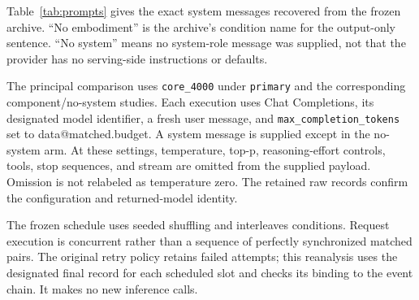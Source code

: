 \documentclass[11pt]{article}
\makeatletter
\newcommand{\D}[1]{\csname data@#1\endcsname}
\makeatother
\begin{document}
Table~\ref{tab:prompts} gives the exact system messages recovered from the frozen archive. ``No embodiment'' is the archive's condition name for the output-only sentence. ``No system'' means no system-role message was supplied, not that the provider has no serving-side instructions or defaults.

\begin{table}[H]
\centering\small

\caption{Exact system conditions. User-message bytes are held fixed within each prompt comparison.}
\label{tab:prompts}
\end{table}

The principal comparison uses \texttt{core\_4000} under \texttt{primary} and the corresponding component/no-system studies. Each execution uses Chat Completions, its designated model identifier, a fresh user message, and \texttt{max\_completion\_tokens} set to \D{matched.budget}. A system message is supplied except in the no-system arm. At these settings, temperature, top-p, reasoning-effort controls, tools, stop sequences, and stream are omitted from the supplied payload. Omission is not relabeled as temperature zero. The retained raw records confirm the configuration and returned-model identity.

The frozen schedule uses seeded shuffling and interleaves conditions. Request execution is concurrent rather than a sequence of perfectly synchronized matched pairs. The original retry policy retains failed attempts; this reanalysis uses the designated final record for each scheduled slot and checks its binding to the event chain. It makes no new inference calls.
\end{document}
